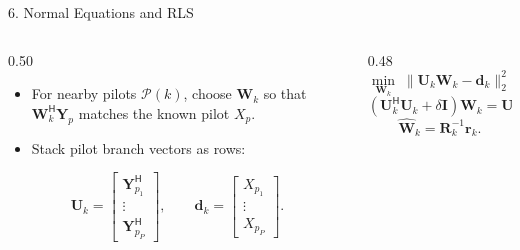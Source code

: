 \documentclass[aspectratio=169,10pt]{beamer}
\newcommand{\vY}{\bm{Y}}
\newcommand{\vW}{\bm{W}}
\newcommand{\herm}{\mathsf{H}}
\begin{document}
\begin{frame}{6. Normal Equations and RLS}

  \begin{columns}[T,onlytextwidth]
    \begin{column}{0.50\textwidth}
      \begin{itemize}\setlength{\itemsep}{0.35em}
        \item For nearby pilots $\mathcal P(k)$, choose $\vW_k$ so that
              $\vW_k^{\herm}\vY_p$ matches the known pilot $X_p$.
        \item Stack pilot branch vectors as rows:
      \end{itemize}
      \vspace{-0.5em}
      \[
        \bm U_k=
        \begin{bmatrix}
          \vY_{p_1}^{\herm}\\[-1pt]
          \vdots\\[-1pt]
          \vY_{p_P}^{\herm}
        \end{bmatrix},
        \qquad
        \bm d_k=
        \begin{bmatrix}
          X_{p_1}\\[-1pt]
          \vdots\\[-1pt]
          X_{p_P}
        \end{bmatrix}.
      \]
    \end{column}

    \begin{column}{0.48\textwidth}
      \vspace{-0.3em}
      \[
        \min_{\vW_k}\;
        \|\bm U_k\vW_k-\bm d_k\|_2^2
        +\delta\|\vW_k\|_2^2
      \]
      \vspace{-0.5em}
      \[
        (\bm U_k^{\herm}\bm U_k+\delta\bm I)\vW_k
        =
        \bm U_k^{\herm}\bm d_k
      \]
      \vspace{-0.5em}
      \[
        \widehat{\vW}_k=\bm R_k^{-1}\bm r_k.
      \]
    \end{column}
  \end{columns}

  \vfill
  \begin{center}
  \end{center}

\end{frame}
\end{document}
